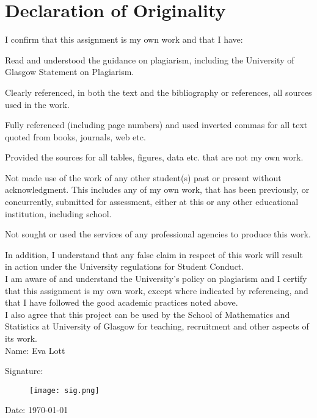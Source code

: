 \documentclass[../Project.tex]{subfiles}
\begin{document}
\newpage
\thispagestyle{empty}

\section*{Declaration of Originality}

I confirm that this assignment is my own work and that I have:
\begin{mitem}
\item Read and understood the guidance on plagiarism,
including the University of Glasgow Statement on Plagiarism.

\item Clearly referenced, in both the text and the bibliography or references, all sources used
in the work.

\item Fully referenced (including page numbers) and used inverted commas for all text
quoted from books, journals, web etc.

\item Provided the sources for all tables, figures, data etc. that are not my own work.

\item Not made use of the work of any other student(s) past or present without acknowledgment. This includes any of my own work, that has been previously, or concurrently, submitted for assessment, either at this or any other educational institution,
including school.

\item Not sought or used the services of any professional agencies to produce this work.

\end{mitem}

In addition, I understand that any false claim in respect of this work will result in
action under the University regulations for Student Conduct.\\

I am aware of and understand the University's policy on plagiarism and I certify that
this assignment is my own work, except where indicated by referencing, and that I
have followed the good academic practices noted above.\\

I also agree that this project can be used by the School of Mathematics and Statistics at
University of Glasgow for teaching, recruitment and other aspects of its work.\\

Name: Eva Lott

Signature:
\begin{figure}[h]
	\centering
	\texttt{[image: sig.png]}
\end{figure}


Date: \today
\end{document}

